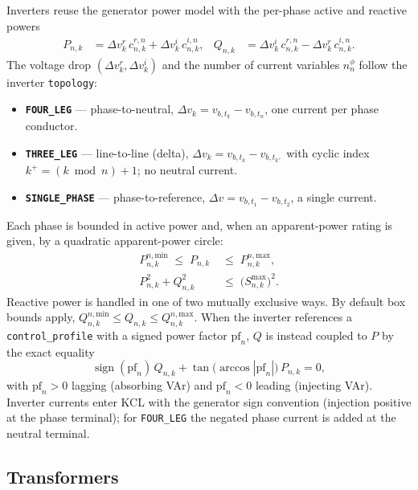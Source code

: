 \documentclass[11pt,a4paper]{article}
\newcommand{\dvr}{\Delta v^r}
\newcommand{\dvi}{\Delta v^i}
\begin{document}
Inverters reuse the generator power model with the per-phase active and reactive
powers
%
\begin{align}
  P_{n,k} &= \dvr_k\,c^{r,n}_{n,k} + \dvi_k\,c^{i,n}_{n,k}, &
  Q_{n,k} &= \dvi_k\,c^{r,n}_{n,k} - \dvr_k\,c^{i,n}_{n,k}.
  \label{eq:inv-pq}
\end{align}
%
The voltage drop $(\dvr_k, \dvi_k)$ and the number of current variables
$n^\phi_n$ follow the inverter \texttt{topology}:
%
\begin{itemize}
  \item \textbf{\texttt{FOUR\_LEG}} --- phase-to-neutral,
        $\Delta v_k = v_{b,t_k} - v_{b,t_n}$, one current per phase conductor.
  \item \textbf{\texttt{THREE\_LEG}} --- line-to-line (delta),
        $\Delta v_k = v_{b,t_k} - v_{b,t_{k^+}}$ with cyclic index
        $k^+ = (k \bmod n) + 1$; no neutral current.
  \item \textbf{\texttt{SINGLE\_PHASE}} --- phase-to-reference,
        $\Delta v = v_{b,t_1} - v_{b,t_2}$, a single current.
\end{itemize}
%
Each phase is bounded in active power and, when an apparent-power rating is
given, by a quadratic apparent-power circle:
%
\begin{align}
  P^{n,\text{min}}_{n,k} \;\leq\; P_{n,k} &\;\leq\; P^{n,\text{max}}_{n,k},
  \label{eq:inv-p}\\
  P_{n,k}^2 + Q_{n,k}^2 &\;\leq\; \bigl(S^{\max}_{n,k}\bigr)^2.
  \label{eq:inv-s}
\end{align}
%
Reactive power is handled in one of two mutually exclusive ways.  By default
box bounds apply,
$Q^{n,\text{min}}_{n,k} \leq Q_{n,k} \leq Q^{n,\text{max}}_{n,k}$.  When the
inverter references a \texttt{control\_profile} with a signed power factor
$\mathrm{pf}_n$, $Q$ is instead coupled to $P$ by the exact equality
%
\begin{equation}
  \operatorname{sign}(\mathrm{pf}_n)\,Q_{n,k}
  + \tan\!\bigl(\arccos|\mathrm{pf}_n|\bigr)\,P_{n,k} = 0,
  \label{eq:inv-pf}
\end{equation}
%
with $\mathrm{pf}_n > 0$ lagging (absorbing VAr) and $\mathrm{pf}_n < 0$ leading
(injecting VAr).  Inverter currents enter KCL with the generator sign convention
(injection positive at the phase terminal); for \texttt{FOUR\_LEG} the negated
phase current is added at the neutral terminal.

\subsection{Transformers}
\end{document}
